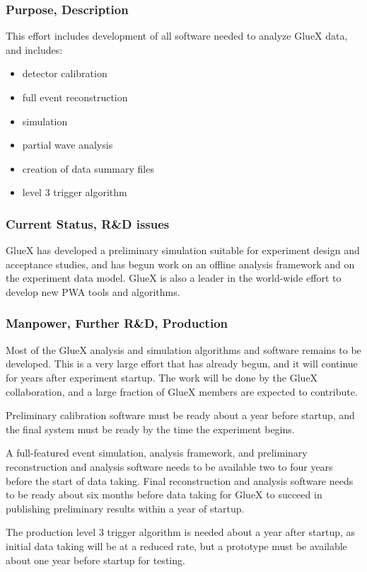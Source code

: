\subsubsection*{Purpose, Description}

This effort includes development of all software needed to analyze GlueX
data, and includes:
\begin{itemize}
\item detector calibration 
\item full event reconstruction
\item simulation
\item partial wave analysis
\item creation of data summary files
\item level 3 trigger algorithm
\end{itemize}


\subsubsection*{Current Status, R\&D issues}

GlueX has developed a preliminary simulation suitable for experiment design
and acceptance studies, and has begun work on an offline analysis
framework and on the experiment data model.  GlueX is also a leader in
the world-wide effort to develop new PWA tools and algorithms.  


\subsubsection*{Manpower, Further R\&D, Production}

Most of the GlueX analysis and simulation algorithms and software
remains to be developed.  This is a very large effort that has already
begun, and it will continue for years after experiment startup.  The
work will be done by the GlueX collaboration, and a large fraction of
GlueX members are expected to contribute.

Preliminary calibration software must be ready about a year before
startup, and the final system must be ready by the time the experiment
begins.

A full-featured event simulation, analysis framework, and preliminary
reconstruction and analysis software needs to be available two to four
years before the start of data taking.  Final reconstruction and
analysis software needs to be ready about six months before data
taking for GlueX to succeed in publishing preliminary results within a
year of startup.

The production level 3 trigger algorithm is needed about a year after
startup, as initial data taking will be at a reduced rate, but a
prototype must be available about one year before startup for testing.

